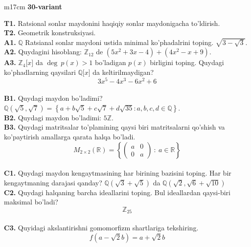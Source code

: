 \documentclass{article}
\begin{document}
\begin{tabular}{m{17cm}}
\textbf{30-variant}
\newline

\textbf{T1.} Ratsional sonlar maydonini haqiqiy sonlar maydonigacha to'ldirish. \\
\textbf{T2.} Geometrik konstruksiyasi. \\
\textbf{A1.} \(\mathbb{Q}\) Ratsianal sonlar maydoni ustida minimal ko'phadalrini toping.
\(\sqrt{3 - \sqrt{3}}\). \\
\textbf{A2.} Quydagini hisoblang:
\(\mathbb{Z}_{12}\) de \(\left( 5x^{2} + 3x - 4 \right) + \left( 4x^{2} - x + 9 \right)\). \\
\textbf{A3.} \(\mathbb{Z}_{4}\lbrack x\rbrack\) da \(\deg\ p(x) > 1\) bo'ladigan \(p(x)\) birligini toping. Quydagi ko'phadlarning qaysilari \(\mathbb{Q\lbrack}x\rbrack\) da keltirilmaydigan?
\[3x^{5} - 4x^{3} - 6x^{2} + 6\] \\
\textbf{B1.} Quydagi maydon bo'ladimi?
\(\mathbb{Q}\left( \sqrt{5},\sqrt{7} \right) = \left\{ a + b\sqrt{5} + c\sqrt{7} + d\sqrt{35}:a,b,c,d \in \mathbb{Q} \right\}\). \\
\textbf{B2.} Quydagi maydon bo'ladimi:
\(5\mathbb{Z}\). \\
\textbf{B3.} Quydagi matritsalar to'plamining qaysi biri matritsalarni qo'shish va ko'paytirish amallarga qarata halqa bo'ladi.
\[M_{2 \times 2}\mathbb{(R) =}\left\{ \begin{pmatrix}
a & 0 \\
0 & a
\end{pmatrix}\ :\ a \in \mathbb{R} \right\}\] \\
\textbf{C1.} Quydagi maydon kengaytmasining har birining bazisini toping. Har bir kengaytmaning darajasi qanday?
\(\mathbb{Q}\left( \sqrt{3} + \sqrt{5} \right)\) da \(\mathbb{Q}\left( \sqrt{2},\sqrt{6} + \sqrt{10} \right)\) \\
\textbf{C2.} Quydagi halqaning barcha ideallarini toping. Bul ideallardan qaysi-biri maksimal bo'ladi?
\[\mathbb{Z}_{25}\] \\
\textbf{C3.} Quyidagi akslantirishni gomomorfizm shartlariga tekshiring.
\[f\left( a - \sqrt{2}b \right) = a + \sqrt{2}b\] \\

\end{tabular}
\vspace{1cm}
\end{document}
